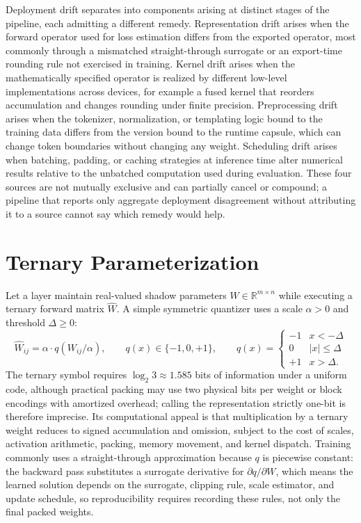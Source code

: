 Deployment drift separates into components arising at distinct stages of the pipeline, each admitting a different remedy. Representation drift arises when the forward operator used for loss estimation differs from the exported operator, most commonly through a mismatched straight-through surrogate or an export-time rounding rule not exercised in training. Kernel drift arises when the mathematically specified operator is realized by different low-level implementations across devices, for example a fused kernel that reorders accumulation and changes rounding under finite precision. Preprocessing drift arises when the tokenizer, normalization, or templating logic bound to the training data differs from the version bound to the runtime capsule, which can change token boundaries without changing any weight. Scheduling drift arises when batching, padding, or caching strategies at inference time alter numerical results relative to the unbatched computation used during evaluation. These four sources are not mutually exclusive and can partially cancel or compound; a pipeline that reports only aggregate deployment disagreement without attributing it to a source cannot say which remedy would help.

\section{Ternary Parameterization}

Let a layer maintain real-valued shadow parameters $W \in \mathbb{R}^{m\times n}$ while executing a ternary forward matrix $\hat{W}$. A simple symmetric quantizer uses a scale $\alpha > 0$ and threshold $\Delta \geq 0$:
\[
\hat{W}_{ij} = \alpha \cdot q(W_{ij}/\alpha), \qquad q(x) \in \{-1,0,+1\}, \qquad q(x) = \begin{cases} -1 & x < -\Delta \\ 0 & |x| \leq \Delta \\ +1 & x > \Delta. \end{cases}
\]
The ternary symbol requires $\log_2 3 \approx 1.585$ bits of information under a uniform code, although practical packing may use two physical bits per weight or block encodings with amortized overhead; calling the representation strictly one-bit is therefore imprecise. Its computational appeal is that multiplication by a ternary weight reduces to signed accumulation and omission, subject to the cost of scales, activation arithmetic, packing, memory movement, and kernel dispatch. Training commonly uses a straight-through approximation because $q$ is piecewise constant: the backward pass substitutes a surrogate derivative for $\partial q/\partial W$, which means the learned solution depends on the surrogate, clipping rule, scale estimator, and update schedule, so reproducibility requires recording these rules, not only the final packed weights.

